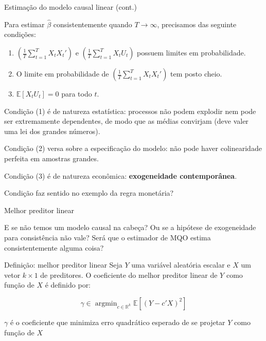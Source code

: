 \documentclass[11pt]{beamer}
\newenvironment{halfwideitemize}{\itemize\addtolength{\itemsep}{0.5em}}{\enditemize}
\begin{document}
	\begin{frame}{Estimação do modelo causal linear (cont.)}
		\begin{halfwideitemize}
			\item Para estimar $\hat{\beta}$ {\color{blue}consistentemente} quando $T \to \infty$, precisamos das seguinte condições:
		\begin{enumerate}
			\item $\left(\frac{1}{T}\sum_{t=1}^T X_t X_t'\right)$ e $\left(\frac{1}{T}\sum_{t=1}^T X_t U_t\right)$ possuem limites em probabilidade.
			\item O limite em probabilidade de $\left(\frac{1}{T}\sum_{t=1}^T X_t X_t'\right)$ tem posto cheio.
			\item $\mathbb{E}[X_t U_t] = 0$ para todo $t$.
		\end{enumerate}
		\item Condição (1) é de natureza {\color{blue}estatística}: processos não podem explodir nem pode ser extremamente dependentes, de modo que as médias convirjam (deve valer uma lei dos grandes números).
		\item Condição (2) versa sobre a {\color{blue}especificação} do modelo: não pode haver colinearidade perfeita em amostras grandes.
		\item Condição (3) é de natureza {\color{blue}econômica}: \textbf{exogeneidade contemporânea}.
		\begin{halfwideitemize}
		\item Condição faz sentido no exemplo da regra monetária?
		\end{halfwideitemize}
	\end{halfwideitemize}
	\end{frame}
	
	\begin{frame}{Melhor preditor linear}
		\begin{halfwideitemize}
			
			\item E se não temos um modelo causal na cabeça? Ou se a hipótese de exogeneidade para consistência não vale? Será que o estimador de MQO estima consistentemente alguma coisa?
		\end{halfwideitemize}
		\begin{block}{Definição: melhor preditor linear}
			Seja $Y$ uma variável aleatória escalar e $X$ um vetor $k\times 1$ de preditores. O {\color{blue}coeficiente do melhor preditor linear} de $Y$ como função de $X$ é {\color{red}definido} por:
			
			$$\gamma \in \operatorname{argmin}_{c \in \mathbb{R}^k} \mathbb{E}[(Y-c'X)^2]$$
		\end{block}
		\begin{halfwideitemize}
			\item $\gamma$ é o coeficiente que minimiza erro quadrático esperado de se projetar $Y$ como função de $X$
		\end{halfwideitemize}
	\end{frame}
	
\end{document}
